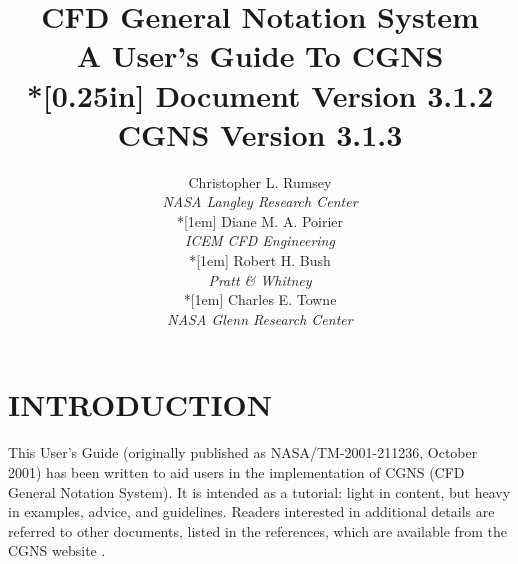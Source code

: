 \documentclass[12pt]{article}
\begin{document}
\posttitle{\par\end{flushleft}\vskip 0.5in}
\preauthor{\begin{flushleft}}
\postauthor{\par\end{flushleft}}
\title{{\bfseries CFD General Notation System\\
A User's Guide To CGNS}\\*[0.25in]
{\Large Document Version 3.1.2\\
CGNS Version 3.1.3}}
\author{Christopher L. Rumsey\\
\textit{NASA Langley Research Center}\\*[1em]
Diane M. A. Poirier\\
\textit{ICEM CFD Engineering}\\*[1em]
Robert H. Bush\\
\textit{Pratt \& Whitney}\\*[1em]
Charles E. Towne\\
\textit{NASA Glenn Research Center}}
\date{}
\maketitle
\thispagestyle{empty}

%
\newpage
\thispagestyle{empty}
\tableofcontents

\newpage
\renewcommand{\thepage}{\arabic{page}}
\section{INTRODUCTION}

This User's Guide (originally published as NASA/TM-2001-211236, October
2001) has been written to aid users in the implementation of CGNS (CFD
General Notation System).
It is intended as a tutorial: light in content, but
heavy in examples, advice, and guidelines.  Readers interested in
additional details are referred to other documents, listed in the references,
which are available from the CGNS website .
\end{document}
